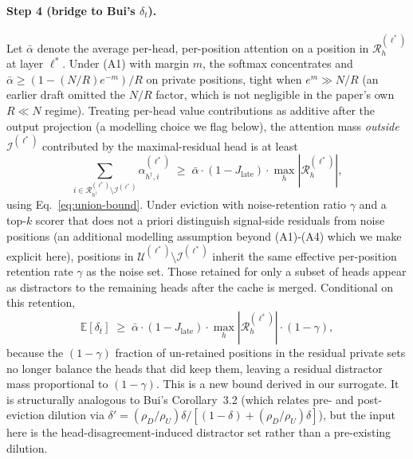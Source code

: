 \paragraph{Step 4 (bridge to Bui's $\delta_t$).}
Let $\bar\alpha$ denote the average per-head, per-position attention on a
position in $\mathcal{R}^{(\ell^*)}_h$ at layer $\ell^*$. Under (A1)
with margin $m$, the softmax concentrates and $\bar\alpha \geq
(1 - (N/R)e^{-m})/R$ on private positions, tight when $e^m \gg N/R$ (an
earlier draft omitted the $N/R$ factor, which is not negligible in the
paper's own $R \ll N$ regime). Treating per-head value
contributions as additive after the output projection (a modelling
choice we flag below), the attention mass \emph{outside}
$\mathcal{I}^{(\ell^*)}$ contributed by the maximal-residual head is at
least
\begin{equation}
\sum_{i \in \mathcal{R}^{(\ell^*)}_{h^\dagger} \setminus
\mathcal{I}^{(\ell^*)}} \alpha^{(\ell^*)}_{h^\dagger, i}
\;\geq\;
\bar\alpha \cdot (1 - J_{\text{late}}) \cdot \max_h
|\mathcal{R}^{(\ell^*)}_h|,
\end{equation}
using Eq.~\eqref{eq:union-bound}. Under eviction with noise-retention
ratio $\gamma$ and a top-$k$ scorer that does not a priori distinguish
signal-side residuals from noise positions (an additional modelling
assumption beyond (A1)-(A4) which we make explicit here), positions in
$\mathcal{U}^{(\ell^*)} \setminus \mathcal{I}^{(\ell^*)}$ inherit the
same effective per-position retention rate $\gamma$ as the noise set.
Those retained for only a subset of heads appear as distractors to the
remaining heads after the cache is merged. Conditional on this
retention,
\begin{equation}
\label{eq:Edelta-lb}
\mathbb{E}[\delta_t]
\;\geq\;
\bar\alpha \cdot (1 - J_{\text{late}}) \cdot
\max_h |\mathcal{R}^{(\ell^*)}_h|
\cdot (1 - \gamma),
\end{equation}
because the $(1 - \gamma)$ fraction of un-retained positions in the
residual private sets no longer balance the heads that did keep them,
leaving a residual distractor mass proportional to $(1 - \gamma)$. This
is a new bound derived in our surrogate. It is structurally analogous
to Bui's Corollary~3.2 (which relates pre- and post-eviction dilution
via $\delta' = (\rho_D/\rho_U)\delta / [(1 - \delta) +
(\rho_D/\rho_U)\delta]$), but the input here is the
head-disagreement-induced distractor set rather than a pre-existing
dilution.

